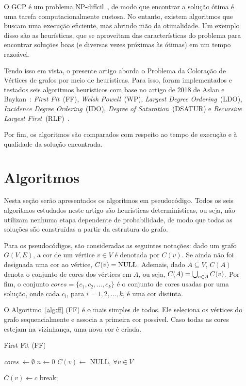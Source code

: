 \documentclass[10pt, twocolumn]{article}
\begin{document}
O GCP é um problema NP-difícil~\cite{AsBa18}, de modo que encontrar a solução ótima é uma 
tarefa computacionalmente custosa. 
No entanto, existem algoritmos que buscam uma execução eficiente, mas abrindo mão
da otimalidade.
Um exemplo disso são as heurísticas, que se aproveitam das características do 
problema para encontrar soluções boas (e diversas vezes próximas às ótimas)
em um tempo razoável.

Tendo isso em vista, o presente artigo aborda o Problema da Coloração de Vértices
de grafos por meio de heurísticas.
Para isso, foram implementados e testados seis algoritmos heurísticos com base no artigo
de 2018 de Aslan e Baykan~\cite{AsBa18}: \emph{First Fit}~(FF), \emph{Welsh Powell}~(WP),
\emph{Largest Degree Ordering}~(LDO), \emph{Incidence Degree Ordering}~(IDO),
\emph{Degree of Saturation}~(DSATUR) e \emph{Recursive Largest First}~(RLF)~\cite{AsBa18}.

Por fim, os algoritmos são comparados com respeito ao tempo de execução e à
qualidade da solução encontrada.


\section{Algoritmos}

Nesta seção serão apresentados os algoritmos em pseudocódigo.
Todos os seis algoritmos estudados neste artigo são heurísticas determinísticas,
ou seja, não utilizam nenhuma etapa dependente de probabilidade, de modo que
todas as soluções são construídas a partir da estrutura do grafo.

Para os pseudocódigos, são consideradas as seguintes notações:
dado um grafo $G(V,E)$, a cor de um vértice $v \in V$ é denotada por $C(v)$.
Se ainda não foi designada uma cor ao vértice, $C(v) = \textnormal{NULL}$.
Ademais, dado $A \subseteq V$, $C(A)$ denota o conjunto de cores dos vértices em $A$,
ou seja, $C(A)\nobreak=\nobreak\bigcup_{v \in A} C(v)$. Por fim, o conjunto
$cores = \{c_1, c_2, \dots, c_k\}$ é o conjunto de cores usadas por uma solução,
onde cada $c_i$, para $i = 1, 2, \dots, k$, é uma cor distinta.

O Algoritmo~\ref{alg:ff} (FF) é o mais simples de todos. Ele seleciona os vértices
do grafo sequencialmente e associa a primeira cor possível. Caso todas as cores
estejam na vizinhança, uma nova cor é criada.

\begin{algorithm}
\caption{First Fit (FF)}
\label{alg:ff}


\emph{cores} $\gets \emptyset$\;
$n \gets 0$\;
$C(v) \gets$ NULL, $\forall v \in V$\;

 {
     {
         {
            $C(v) \gets c$\;
            break;
        }
    }
}
\;

\end{algorithm}
\end{document}
